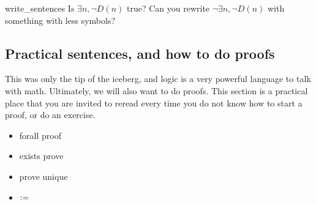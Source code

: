 \begin{cex}{}{write_sentences}
    Is \( \exists n, \neg D(n) \) true? Can you rewrite \( \neg \exists n, \neg D(n) \) with something with less symbols?
\end{cex}


\subsection{Practical sentences, and how to do proofs}

This was only the tip of the iceberg, and logic is a very powerful language to talk with math. Ultimately, we will also want to do proofs. This section is a practical place that you are invited to reread every time you do not know how to start a proof, or do an exercise. 


\begin{itemize}
    \item forall proof
    \item exists prove
    \item prove unique
    \item \( := \)
\end{itemize}